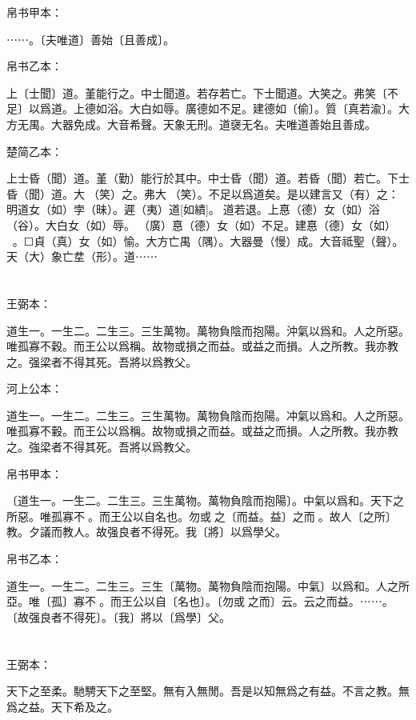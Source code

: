 \documentclass[a5paper]{ctexbook}
\begin{document}
    帛书甲本：

    ⋯⋯。〔夫唯道〕善始〔且善成〕。

    帛书乙本：

    上〔士聞〕道。堇能行之。中士聞道。若存若亡。下士聞道。大笑之。弗笑〔不足〕以爲道。上德如浴。大白如辱。廣德如不足。建德如〔偷〕。質〔真若渝〕。大方无禺。大器免成。大音希聲。天象无刑。道襃无名。夫唯道善始且善成。

    楚简乙本：

    上士昏（聞）道。堇（勤）能行於其中。中士昏（聞）道。若昏（聞）若亡。下士昏（聞）道。大𦬫（笑）之。弗大𦬫（笑）。不足以爲道矣。是以建言又（有）之：明道女（如）孛（昧）。遲（夷）道[如繢]。☐道若退。上惪（德）女（如）浴（谷）。大白女（如）辱。󼧊（廣）惪（德）女（如）不足。建惪（德）女（如）󲳴☐。☐貞（真）女（如）愉。大方亡禺（隅）。大器曼（慢）成。大音祗聖（聲）。天（大）象亡坓（形）。道⋯⋯

    \chapter{}
    王弼本：

    道生一。一生二。二生三。三生萬物。萬物負陰而抱陽。沖氣以爲和。人之所惡。唯孤寡不穀。而王公以爲稱。故物或損之而益。或益之而損。人之所教。我亦教之。强梁者不得其死。吾將以爲教父。

    河上公本：

    道生一。一生二。二生三。三生萬物。萬物負陰而抱陽。冲氣以爲和。人之所惡。唯孤寡不轂。而王公以爲稱。故物或損之而益。或益之而損。人之所教。我亦教之。強梁者不得其死。吾將以爲教父。

    帛书甲本：

    〔道生一。一生二。二生三。三生萬物。萬物負陰而抱陽〕。中氣以爲和。天下之所惡。唯孤寡不𥞤。而王公以自名也。勿或𢿃之〔而益。益〕之而𢿃。故人〔之所〕教。夕議而教人。故强良者不得死。我〔將〕以爲學父。

    帛书乙本：

    道生一。一生二。二生三。三生〔萬物。萬物負陰而抱陽。中氣〕以爲和。人之所亞。唯〔孤〕寡不𥞤。而王公以自〔名也〕。〔勿或𢿃之而〕云。云之而益。⋯⋯。〔故强良者不得死〕。〔我〕將以〔爲學〕父。

    \chapter{}
    王弼本：

    天下之至柔。馳騁天下之至堅。無有入無閒。吾是以知無爲之有益。不言之教。無爲之益。天下希及之。
\end{document}
